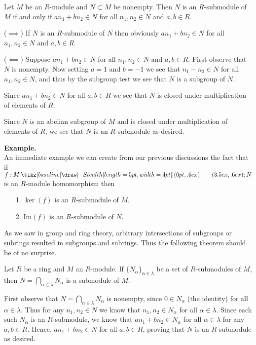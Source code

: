 \documentclass[12pt,letterpaper]{algebra_book}
\renewcommand{\to}{\mathbin{\tikz[baseline] \draw[-{Stealth[length=5pt,width=4pt]}] (0pt,.6ex) -- (3.5ex,.6ex);}}
\newcommand{\im}{\mbox{Im}}
\theoremstyle{definition}
\begin{document}
\begin{thm} Let $M$ be an $R$-module and $N
\subset M$ be nonempty. Then $N$ is an $R$-submodule of $M$ if and
only if $an_1 + bn_2 \in N$ for all $n_1, n_2 \in N$ and $a, b \in
R$. 
\end{thm}

\begin{prf}
    ($\implies$) If $N$ is an $R$-submodule of $N$ then obviously $an_1 + bn_2
    \in N$ for all $n_1, n_2 \in N$ and $a, b \in R$. 

    ($\impliedby$) Suppose $an_1 + bn_2 \in N$ for all $n_1, n_2
    \in N$ and $a, b \in R$. 
    First observe that $N$ is nonempty. Now
    setting $a = 1$ and $b = -1$ we
    see that $n_1 - n_2 \in N$ for all $n_1, n_2 \in N$, and thus
    by the subgroup test we see that $N$ is a subgroup of $N$. 

    Since $an_1 + bn_2 \in N$ for all $a, b \in R$ we see that $N$
    is closed under multiplication of elements of $R$. 

    Since $N$ is an abelian subgroup of $M$ and is closed under
    multiplication of elements of $R$, we see that $N$ is an
    $R$-submodule as desired. 
\end{prf}

\noindent \textbf{Example.}\\
An immediate example we can create from our previous discussions
the fact that if $f: M \to N$ is an $R$-module homomorphism then 
\begin{itemize}
    \item[1.] $\ker(f)$ is an $R$-submodule of $M$.
    \item[2.] $\im(f)$ is an $R$-submodule of $N$. 
\end{itemize}

As we saw in group and ring theory, arbitrary intersections of
subgroups or subrings resulted in subgroups and subrings. Thus the
following theorem should be of no surprise.

\begin{thm}
    Let $R$ be a ring and $M$ an $R$-module. If $\{N_\alpha\}_{\alpha \in \lambda}$ be a
    set of $R$-submodules of $M$, then $N = \bigcap_{\alpha \in
    \lambda}N_{\alpha}$ is a submodule of $M$. 
\end{thm}

\begin{prf}
    First observe that $N = \bigcap_{\alpha \in
    \lambda}N_{\alpha}$ is nonempty, since $0 \in N_\alpha$ (the
    identity) for all $\alpha \in \lambda$. Thus for any $n_1, n_2
    \in N$ we know that $n_1, n_2 \in N_\alpha$ for all $\alpha
    \in \lambda$. Since each such $N_\alpha$ is an $R$-submodule,
    we know that $an_1 + bn_2 \in N_\alpha$ for all $\alpha \in 
    \lambda$ for any $a, b \in R$. Hence, $an_1 + bn_2 \in N$ for
    all $a, b \in R$, proving that $N$ is an $R$-submodule as
    desired. 
\end{prf}
\end{document}
